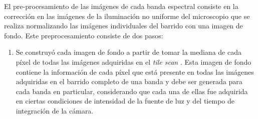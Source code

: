 El pre-procesamiento de las imágenes de cada banda espectral consiste en la corrección en las imágenes de la iluminación no uniforme del microscopio que se realiza normalizando las imágenes individuales del barrido con una imagen de fondo. Este preprocesamiento consiste de dos pasos:
\begin{enumerate}
	\item  Se construyó cada imagen de fondo a partir de tomar la mediana de cada píxel de todas las imágenes adquiridas en el \textit{tile scan} \cite{Nordenfelt}. Esta imagen de fondo contiene la información de cada píxel que está presente en todas las imágenes adquiridas en el barrido completo de una banda y debe ser generada para cada banda en particular, considerando que cada una de ellas fue adquirida en ciertas condiciones de intensidad de la fuente de luz y del tiempo de integración de la cámara. 
	

\end{enumerate}
